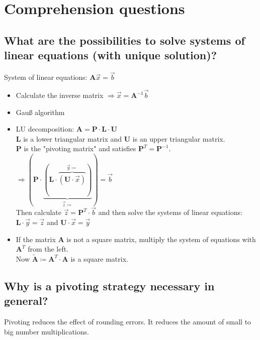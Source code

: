 \setcounter{section}{-1}
\section{Comprehension questions}

\subsection{What are the possibilities to solve systems of linear equations (with unique solution)?}

System of linear equations: $\symbf{A} \overrightarrow{x}=\overrightarrow{b}$

\begin{itemize}
    \item Calculate the inverse matrix $\Rightarrow \overrightarrow{x} = \symbf{A}^{-1} \overrightarrow{b}$
    \item Gauß algorithm
    \item LU decomposition: $\symbf{A} = \symbf{P} \cdot \symbf{L} \cdot \symbf{U}$ \\
        $\symbf{L}$ is a lower triangular matrix and $\symbf{U}$ is an upper triangular matrix. \\
        $\symbf{P}$ is the "pivoting matrix" and satisfies $\symbf{P}^T=\symbf{P}^{-1}$. \\
        $\Rightarrow ( \symbf{P} \cdot \underbrace{ ( \symbf{L} \cdot \overbrace{ ( \symbf{U} \cdot \overrightarrow{x} ) }^{\overrightarrow{y}\coloneqq} ) }_{\overrightarrow{z} \coloneqq} ) = \overrightarrow{b}$ \\
        Then calculate $\overrightarrow{z} = \symbf{P}^T \cdot \overrightarrow{b}$ 
        and then solve the systems of linear equations:  \\
        $\symbf{L}\cdot\overrightarrow{y}=\overrightarrow{z}$ and $\symbf{U}\cdot\overrightarrow{x} = \overrightarrow{y}$
    \item If the matrix $\symbf{A}$ is not a square matrix, multiply the system of equations with $\symbf{A}^T$ from the left. \\
        Now $\tilde{\symbf{A}} \coloneqq \symbf{A}^T \cdot \symbf{A}$ is a square matrix.
  \end{itemize}

\subsection{Why is a pivoting strategy necessary in general?}

Pivoting reduces the effect of rounding errors. It reduces the amount of small to big number multiplications.